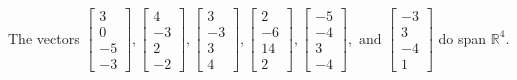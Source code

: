 \begin{exercise}
\begin{exerciseStatement}
  \end{exerciseStatement}
  \begin{exerciseAnswer}
   The vectors \(\left[\begin{array}{r}
3 \\
0 \\
-5 \\
-3
\end{array}\right] , \left[\begin{array}{r}
4 \\
-3 \\
2 \\
-2
\end{array}\right] , \left[\begin{array}{r}
3 \\
-3 \\
3 \\
4
\end{array}\right] , \left[\begin{array}{r}
2 \\
-6 \\
14 \\
2
\end{array}\right] , \left[\begin{array}{r}
-5 \\
-4 \\
3 \\
-4
\end{array}\right] , \text{ and } \left[\begin{array}{r}
-3 \\
3 \\
-4 \\
1
\end{array}\right]\) 
  	 do  
	span \(\mathbb{R}^4\).
  


  \end{exerciseAnswer}
\end{exercise}